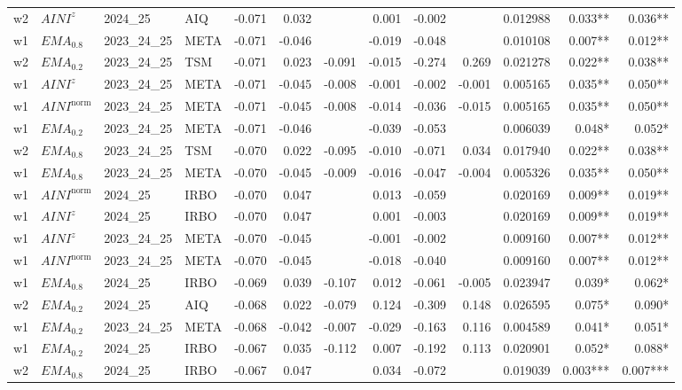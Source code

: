 \begin{longtable}{@{}llllrrrrrrrrr@{}}
w2 & $AINI^{z}$ & 2024\_25 & AIQ & -0.071 & 0.032 &  & 0.001 & -0.002 &  & 0.012988 & 0.033** & 0.036** \\
w1 & $EMA_{0.8}$ & 2023\_24\_25 & META & -0.071 & -0.046 &  & -0.019 & -0.048 &  & 0.010108 & 0.007** & 0.012** \\
w2 & $EMA_{0.2}$ & 2023\_24\_25 & TSM & -0.071 & 0.023 & -0.091 & -0.015 & -0.274 & 0.269 & 0.021278 & 0.022** & 0.038** \\
w1 & $AINI^{z}$ & 2023\_24\_25 & META & -0.071 & -0.045 & -0.008 & -0.001 & -0.002 & -0.001 & 0.005165 & 0.035** & 0.050** \\
w1 & $AINI^{\mathrm{norm}}$ & 2023\_24\_25 & META & -0.071 & -0.045 & -0.008 & -0.014 & -0.036 & -0.015 & 0.005165 & 0.035** & 0.050** \\
w1 & $EMA_{0.2}$ & 2023\_24\_25 & META & -0.071 & -0.046 &  & -0.039 & -0.053 &  & 0.006039 & 0.048* & 0.052* \\
w2 & $EMA_{0.8}$ & 2023\_24\_25 & TSM & -0.070 & 0.022 & -0.095 & -0.010 & -0.071 & 0.034 & 0.017940 & 0.022** & 0.038** \\
w1 & $EMA_{0.8}$ & 2023\_24\_25 & META & -0.070 & -0.045 & -0.009 & -0.016 & -0.047 & -0.004 & 0.005326 & 0.035** & 0.050** \\
w1 & $AINI^{\mathrm{norm}}$ & 2024\_25 & IRBO & -0.070 & 0.047 &  & 0.013 & -0.059 &  & 0.020169 & 0.009** & 0.019** \\
w1 & $AINI^{z}$ & 2024\_25 & IRBO & -0.070 & 0.047 &  & 0.001 & -0.003 &  & 0.020169 & 0.009** & 0.019** \\
w1 & $AINI^{z}$ & 2023\_24\_25 & META & -0.070 & -0.045 &  & -0.001 & -0.002 &  & 0.009160 & 0.007** & 0.012** \\
w1 & $AINI^{\mathrm{norm}}$ & 2023\_24\_25 & META & -0.070 & -0.045 &  & -0.018 & -0.040 &  & 0.009160 & 0.007** & 0.012** \\
w1 & $EMA_{0.8}$ & 2024\_25 & IRBO & -0.069 & 0.039 & -0.107 & 0.012 & -0.061 & -0.005 & 0.023947 & 0.039* & 0.062* \\
w2 & $EMA_{0.2}$ & 2024\_25 & AIQ & -0.068 & 0.022 & -0.079 & 0.124 & -0.309 & 0.148 & 0.026595 & 0.075* & 0.090* \\
w1 & $EMA_{0.2}$ & 2023\_24\_25 & META & -0.068 & -0.042 & -0.007 & -0.029 & -0.163 & 0.116 & 0.004589 & 0.041* & 0.051* \\
w1 & $EMA_{0.2}$ & 2024\_25 & IRBO & -0.067 & 0.035 & -0.112 & 0.007 & -0.192 & 0.113 & 0.020901 & 0.052* & 0.088* \\
w2 & $EMA_{0.8}$ & 2024\_25 & IRBO & -0.067 & 0.047 &  & 0.034 & -0.072 &  & 0.019039 & 0.003*** & 0.007*** \\

\end{longtable}
